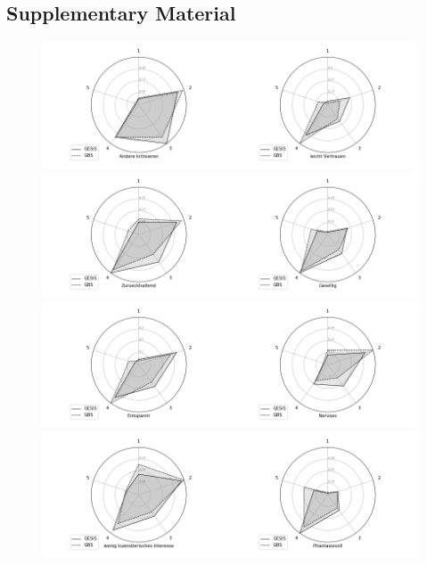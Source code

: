
\begin{appendices}


\chapter{Supplementary Material}

\begin{figure}[ht]
	\begin{center}
\includegraphics[scale=0.45,angle=0]{fig/Agreeablenessfigure} \\
\includegraphics[scale=0.33,angle=0]{fig/Extraversionfigure} \\
\includegraphics[scale=0.33,angle=0]{fig/Neuroticismfigure} \\
\includegraphics[scale=0.33,angle=0]{fig/Opennessfigure} \\

\end{center}
\end{figure}
\end{appendices}
